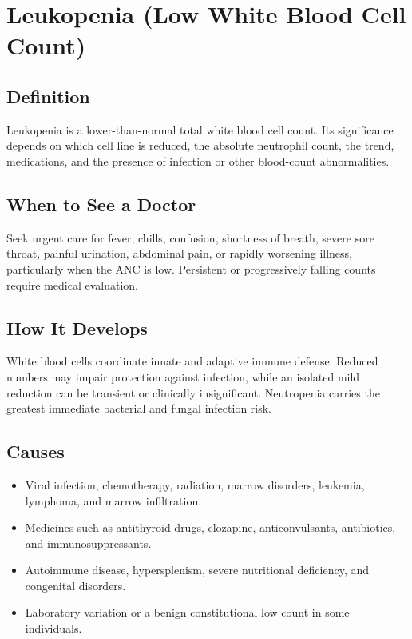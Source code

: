 \chapter{Leukopenia (Low White Blood Cell Count)}

\section*{Definition}
Leukopenia is a lower-than-normal total white blood cell count. Its significance depends on which cell line is reduced, the absolute neutrophil count, the trend, medications, and the presence of infection or other blood-count abnormalities.

\section*{When to See a Doctor}
Seek urgent care for fever, chills, confusion, shortness of breath, severe sore throat, painful urination, abdominal pain, or rapidly worsening illness, particularly when the ANC is low. Persistent or progressively falling counts require medical evaluation.

\section*{How It Develops}
White blood cells coordinate innate and adaptive immune defense. Reduced numbers may impair protection against infection, while an isolated mild reduction can be transient or clinically insignificant. Neutropenia carries the greatest immediate bacterial and fungal infection risk.

\section*{Causes}
\begin{itemize}
  \item Viral infection, chemotherapy, radiation, marrow disorders, leukemia, lymphoma, and marrow infiltration.
  \item Medicines such as antithyroid drugs, clozapine, anticonvulsants, antibiotics, and immunosuppressants.
  \item Autoimmune disease, hypersplenism, severe nutritional deficiency, and congenital disorders.
  \item Laboratory variation or a benign constitutional low count in some individuals.
\end{itemize}

